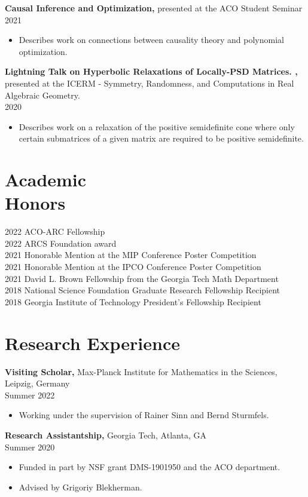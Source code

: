 \documentclass[margin]{res}
\begin{document}
\begin{resume}
{\bf  Causal Inference and Optimization,} presented at the ACO Student Seminar \\ 2021
\begin{itemize} \itemsep -2pt %
\item Describes work on connections between causality theory and polynomial optimization.
\end{itemize}

{\bf  Lightning Talk on Hyperbolic Relaxations of Locally-PSD Matrices.
,} 
presented at the ICERM - Symmetry, Randomness, and Computations in Real Algebraic Geometry.
 \\ 2020
\begin{itemize} \itemsep -2pt %
\item Describes work on a relaxation of the positive semidefinite cone where only certain submatrices of a given matrix are required to be positive semidefinite.
\end{itemize}


\section{Academic \\ Honors} 
2022 ACO-ARC Fellowship\\
2022 ARCS Foundation award\\
2021 Honorable Mention at the MIP Conference Poster Competition\\
2021 Honorable Mention at the IPCO Conference Poster Competition\\
2021 David L. Brown Fellowship from the Georgia Tech Math Department\\
2018 National Science Foundation Graduate Research Fellowship Recipient\\
2018 Georgia Institute of Technology President's Fellowship Recipient

\section{Research Experience}
{\bf Visiting Scholar,} Max-Planck Institute for Mathematics in the Sciences, Leipzig, Germany \\ Summer 2022
\begin{itemize} \itemsep -2pt %
\item Working under the supervision of Rainer Sinn and Bernd Sturmfels.
\end{itemize}
{\bf Research Assistantship,} Georgia Tech, Atlanta, GA \\ Summer 2020
\begin{itemize} \itemsep -2pt %
\item Funded in part by NSF grant DMS-1901950 and the ACO department.
\item Advised by Grigoriy Blekherman.
\end{itemize}
 

\end{resume}
\end{document}
